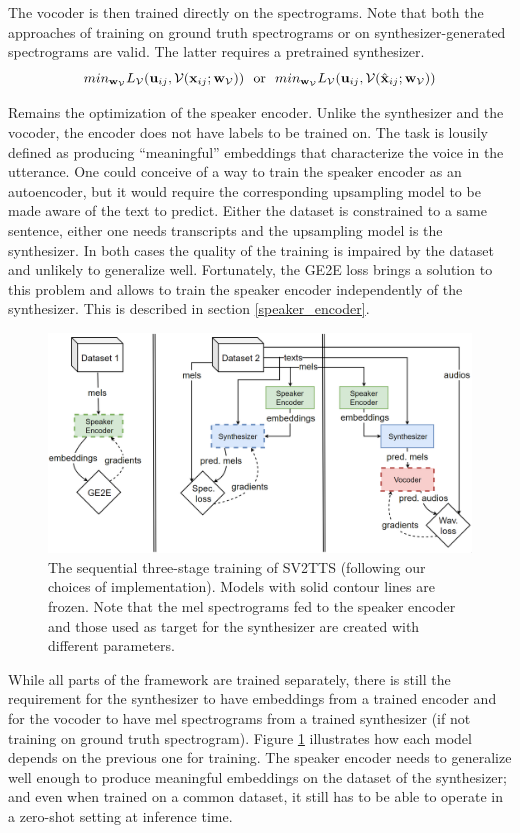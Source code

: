 \documentclass[a4paper, oneside, 12pt, english]{article}
\begin{document}
The vocoder is then trained directly on the spectrograms. Note that both the approaches of training on ground truth spectrograms or on synthesizer-generated spectrograms are valid. The latter requires a pretrained synthesizer.
$$ min_{\vw_\voc} L_\voc(\vu_{ij}, \voc(\vx_{ij}; \vw_\voc)) \ \ \text{or} \ \ 
   min_{\vw_\voc} L_\voc(\vu_{ij}, \voc(\hat\vx_{ij}; \vw_\voc)) $$

Remains the optimization of the speaker encoder. Unlike the synthesizer and the vocoder, the encoder does not have labels to be trained on. The task is lousily defined as producing ``meaningful'' embeddings that characterize the voice in the utterance. One could conceive of a way to train the speaker encoder as an autoencoder, but it would require the corresponding upsampling model to be made aware of the text to predict. Either the dataset is constrained to a same sentence, either one needs transcripts and the upsampling model is the synthesizer. In both cases the quality of the training is impaired by the dataset and unlikely to generalize well. Fortunately, the GE2E loss \citep{GE2E} brings a solution to this problem and allows to train the speaker encoder independently of the synthesizer. This is described in section \ref{speaker_encoder}. 

\begin{figure}[h]
	\centering
	\includegraphics[width=\linewidth]{images/sv2tts_training.png}
	\caption{The sequential three-stage training of SV2TTS (following our choices of implementation). Models with solid contour lines are frozen. Note that the mel spectrograms fed to the speaker encoder and those used as target for the synthesizer are created with different parameters.}
	\label{sv2tts_training}
\end{figure}

While all parts of the framework are trained separately, there is still the requirement for the synthesizer to have embeddings from a trained encoder and for the vocoder to have mel spectrograms from a trained synthesizer (if not training on ground truth spectrogram). Figure \ref{sv2tts_training} illustrates how each model depends on the previous one for training. The speaker encoder needs to generalize well enough to produce meaningful embeddings on the dataset of the synthesizer; and even when trained on a common dataset, it still has to be able to operate in a zero-shot setting at inference time. 
\end{document}
